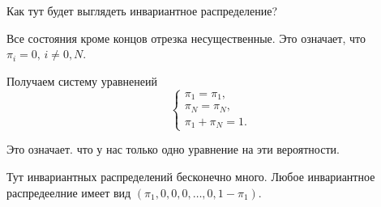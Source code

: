Как тут будет выглядеть инвариантное распределение?

Все состояния кроме концов отрезка несущественные.
Это означает, что $ \pi_i = 0, \, i \neq 0, N$.

Получаем систему уравненеий
\begin{equation*}
  \begin{cases}
    \pi_1 = \pi_1, \\
    \pi_N = \pi_N, \\
    \pi_1 + \pi_N = 1.
  \end{cases}
\end{equation*}

Это означает. что у нас только одно уравнение на эти вероятности.

Тут инвариантных распределений бесконечно много.
Любое инвариантное распредеелние имеет вид $ \left( \pi_1, 0, 0, 0, \dotsc, 0, 1 - \pi_1 \right) $.
